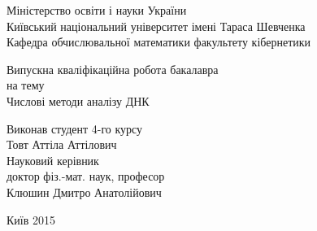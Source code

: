 \documentclass[14pt,a4paper,titlepage]{extarticle}
\begin{document}
\begin{titlepage}
\begin{center}
Міністерство освіти і науки України \\
Київський національний університет імені Тараса Шевченка \\
Кафедра обчислювальної математики факультету кібернетики

\vfill

\Large Випускна кваліфікаційна робота бакалавра \\
на тему \\
\LARGE Числові методи аналізу ДНК
\end{center}

\vfill

\begin{flushright}
Виконав студент 4-го курсу \\
Товт Аттіла Аттілович \\[1cm]

Науковий керівник \\
доктор фіз.-мат. наук, професор \\
Клюшин Дмитро Анатолійович
\end{flushright}

\center Київ 2015


\end{titlepage}

 \tableofcontents
 \newpage
\end{document}
